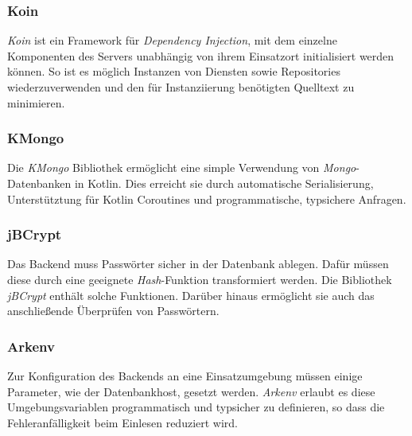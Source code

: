 \documentclass[a4paper, 11pt]{article}
\begin{document}
\subsubsection{Koin}
\label{subsubsec:backend:bibs:koin}

\textit{Koin} ist ein Framework für \textit{Dependency Injection}, mit dem einzelne Komponenten des Servers unabhängig von ihrem Einsatzort initialisiert werden können.
So ist es möglich Instanzen von Diensten sowie Repositories wiederzuverwenden und den für Instanziierung benötigten Quelltext zu minimieren.

\subsubsection{KMongo}
\label{subsubsec:backend:bibs:kmongo}

Die \textit{KMongo} Bibliothek ermöglicht eine simple Verwendung von \textit{Mongo}-Datenbanken in Kotlin.
Dies erreicht sie durch automatische Serialisierung, Unterstütztung für Kotlin Coroutines und programmatische, typsichere Anfragen.

\subsubsection{jBCrypt}
\label{subsubsec:backend:bibs:jbcrypt}

Das Backend muss Passwörter sicher in der Datenbank ablegen.
Dafür müssen diese durch eine geeignete \textit{Hash}-Funktion transformiert werden.
Die Bibliothek \textit{jBCrypt} enthält solche Funktionen.
Darüber hinaus ermöglicht sie auch das anschließende Überprüfen von Passwörtern.

\subsubsection{Arkenv}
\label{subsubsec:backend:bibs:arkenv}

Zur Konfiguration des Backends an eine Einsatzumgebung müssen einige Parameter, wie der Datenbankhost, gesetzt werden.
\textit{Arkenv} erlaubt es diese Umgebungsvariablen programmatisch und typsicher zu definieren, so dass die Fehleranfälligkeit beim Einlesen reduziert wird.
\end{document}
